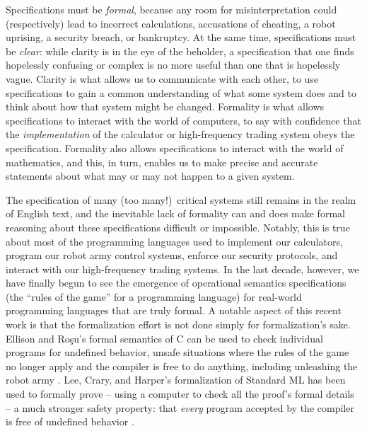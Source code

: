 Specifications must be {\it formal}, because any room for
misinterpretation could (respectively) lead to incorrect calculations,
accusations of cheating, a robot uprising, a security breach, or
bankruptcy. At the same time, specifications must be {\it clear}:
while clarity is in the eye of the beholder, a specification
that one finds hopelessly confusing or complex is no more useful than
one that is hopelessly vague.
%
Clarity is what allows us to
communicate with each other, to use specifications to gain a common
understanding of what some system does and to think about how that
system might be changed. Formality is what allows specifications to
interact with the world of computers, to say with confidence that the
{\it implementation} of the calculator or high-frequency trading
system obeys the specification. Formality also allows specifications
to interact with the world of mathematics, and this, in turn, enables
us to make precise and accurate statements about what may or may not
happen to a given system.

The specification of many (too many!)~critical systems still remains
in the realm of English text, and the inevitable lack of formality can
and does make formal reasoning about these specifications difficult or
impossible.
%
Notably, this is true about most of the programming languages used to
implement our calculators, program our robot army control systems,
enforce our security protocols, and interact with our high-frequency
trading systems. In the last decade, however, we have finally begun to
see the emergence of operational semantics specifications (the ``rules
of the game'' for a programming language) for real-world programming
languages that are truly formal.
%
A notable aspect of this recent work is that the formalization
effort is not done simply for formalization's sake. Ellison and Ro{\c
  s}u's formal semantics of C can be used to check individual programs
for undefined behavior, unsafe situations where the rules of the game
no longer apply and the compiler is free to do anything, including
unleashing the robot army \cite{ellison12executable}. Lee, Crary, and
Harper's formalization of Standard ML has been used to formally prove
-- using a computer to check all the proof's formal details -- a much
stronger safety property: that {\it every} program accepted by the
compiler is free of undefined behavior \cite{lee07towards}.

